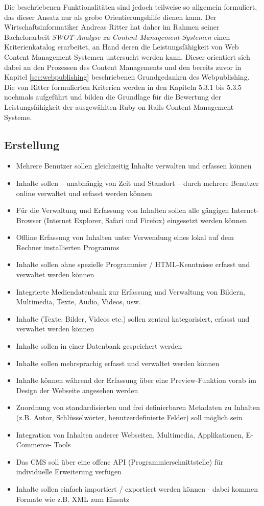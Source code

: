 Die beschriebenen Funktionalitäten sind jedoch teilweise so allgemein formuliert, das dieser Ansatz nur als grobe Orientierungshilfe dienen kann.
Der Wirtschaftsinformatiker Andreas Ritter hat daher im Rahmen seiner Bachelorarbeit \emph{SWOT-Analyse zu Content-Management-Systemen} einen Kriterienkatalog erarbeitet, an Hand deren die Leistungsfähigkeit von Web Content Management Systemen untersucht werden kann. Dieser orientiert sich dabei an den Prozessen des Content Managements und den bereits zuvor in Kapitel \ref{sec:webpublishing} beschriebenen Grundgedanken des Webpublishing.
\newline
\newline
Die von Ritter formulierten Kriterien werden in den Kapiteln 5.3.1 bis 5.3.5 nochmals aufgeführt und bilden die Grundlage für die Bewertung der Leistungsfähigkeit der ausgewählten Ruby on Rails Content Management Systeme.

\subsection{Erstellung}
\begin{itemize}
\item
Mehrere Benutzer sollen gleichzeitig Inhalte verwalten und erfassen können
\item
Inhalte sollen – unabhängig von Zeit und Standort – durch mehrere Benutzer online verwaltet und erfasst werden können
\item
Für die Verwaltung und Erfassung von Inhalten sollen alle gängigen Internet-Browser (Internet Explorer, Safari und Firefox) eingesetzt werden können
\item
Offline Erfassung von Inhalten unter Verwendung eines lokal auf dem Rechner installierten Programms
\item
Inhalte sollen ohne spezielle Programmier / HTML-Kenntnisse erfasst und verwaltet werden können
\item
Integrierte Mediendatenbank zur Erfassung und Verwaltung von Bildern, Multimedia, Texte, Audio, Videos, usw.
\item
Inhalte (Texte, Bilder, Videos etc.) sollen zentral kategorisiert, erfasst und verwaltet werden können
\item
Inhalte sollen in einer Datenbank gespeichert werden
\item
Inhalte sollen mehrsprachig erfasst und verwaltet werden können
\item
Inhalte können während der Erfassung über eine Preview-Funktion vorab im Design der Webseite angesehen werden
\item
Zuordnung von standardisierten und frei definierbaren Metadaten zu Inhalten (z.B. Autor, Schlüsselwörter, benutzerdefinierte Felder) soll möglich sein
\item
Integration von Inhalten anderer Webseiten, Multimedia, Applikationen, E-Commerce- Tools
\item
Das CMS soll über eine offene API (Programmierschnittstelle) für individuelle Erweiterung verfügen
\item
Inhalte sollen einfach importiert / exportiert werden können - dabei kommen Formate wie z.B. XML zum Einsatz
\end{itemize}



